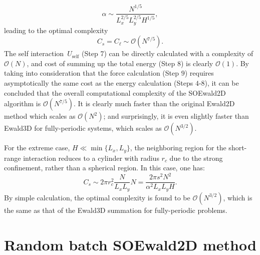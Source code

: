\begin{equation}
	\alpha \sim \frac{N^{1/5}}{L_x^{2/5}L_y^{2/5}H^{1/5}},
\end{equation}
leading to the optimal complexity
\begin{equation}\label{eq::70}
	C_{s} = C_{\ell} \sim \mathcal{O}(N^{7/5}).
\end{equation}
The self interaction~$U_{\text{self}}$ (Step 7) can be directly calculated with a complexity of $\mathcal{O}(N)$, and cost of summing up the total energy (Step 8) is clearly $\mathcal{O}(1)$.
By taking into consideration that the force calculation (Step $9$) requires asymptotically the same cost as the energy calculation (Steps $4$-$8$), it can be concluded that the overall computational complexity of the SOEwald2D algorithm is $\mathcal{O}(N^{7/5})$. 
It is clearly much faster than the original Ewald2D method which scales as $\mathcal{O}(N^{2})$; and surprisingly, it is even slightly faster than Ewald3D for fully-periodic systems, which scales as $\mathcal{O}(N^{3/2})$.

\begin{rmk}\label{rmk::extreme}
	For the extreme case, $H \ll \min\{L_x,L_y\}$, the neighboring region for the short-range interaction reduces to a cylinder with radius $r_c$ due to the strong confinement, rather than a spherical region. 
	In this case, one has:
	\begin{equation}
		C_{s}\sim 2\pi r_c^2 \frac{N}{L_x L_y} N=\frac{2\pi s^2N^2}{\alpha^2L_x L_y H}.
	\end{equation}
	By simple calculation, the optimal complexity is found to be $\mathcal{O}(N^{3/2})$, which is the same as that of the Ewald3D summation for fully-periodic problems. 
\end{rmk}


\section{Random batch SOEwald2D method} \label{sec:rbm}

